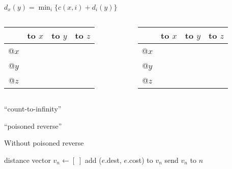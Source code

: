 \begin{cf}{\small

	$d_x(y) = \min_i \{c(x,i) + d_i(y) \}$\\[1cm]

	\begin{columns}
		\begin{column}{.5\linewidth}
		\begin{tabular}{|c|c|c|c|}
		\hline
		 & to $x$ & to $y$ & to $z$ \\
		\hline
	  @$x$ & & & \\
	  @$y$ & & & \\
	  @$z$ & & & \\
		\hline
		\end{tabular}
		\end{column}
		\begin{column}{.5\linewidth}
		\begin{tabular}{|c|c|c|c|}
		\hline
		 & to $x$ & to $y$ & to $z$ \\
		\hline
	  @$x$ & & & \\
	  @$y$ & & & \\
	  @$z$ & & & \\
		\hline
		\end{tabular}
		\end{column}
	\end{columns}
}
\end{cf}

\begin{cf}{
	``count-to-infinity''
}
\end{cf}
\begin{cf}{
	``poisoned reverse''
}
\end{cf}

\begin{cf}{
	Without poisoned reverse\\[1cm]

	\small
	\begin{algorithmic}
		\State distance vector $v_n \gets [\;]$
			  \State add ($e$.dest, $e$.cost) to $v_n$
			\EndFor
		\State send $v_n$ to $n$
		\EndFor
	\end{algorithmic}
}
\end{cf}

